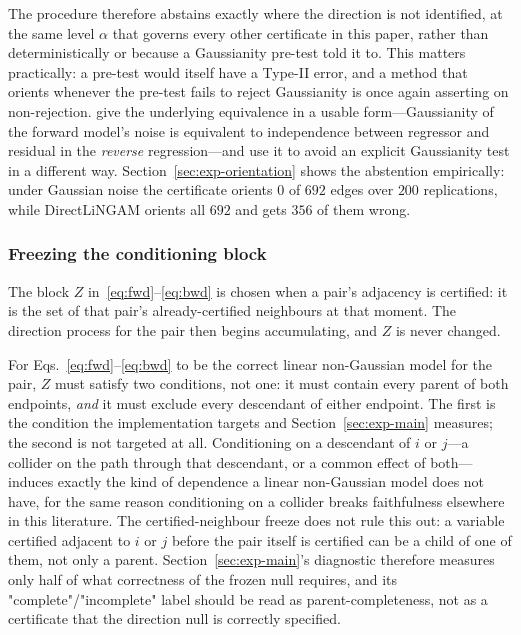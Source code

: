 The procedure therefore abstains exactly where the direction is not
identified, at the same level $\alpha$ that governs every other certificate in
this paper, rather than deterministically or because a Gaussianity pre-test
told it to. This matters practically: a pre-test would itself have a Type-II
error, and a method that orients whenever the pre-test fails to reject
Gaussianity is once again asserting on non-rejection.
\citet{ding2025gaussdetect} give the underlying equivalence in a usable
form---Gaussianity of the forward model's noise is equivalent to independence
between regressor and residual in the \emph{reverse} regression---and use it
to avoid an explicit Gaussianity test in a different way.
Section~\ref{sec:exp-orientation} shows the abstention empirically: under
Gaussian noise the certificate orients $0$ of $692$ edges over $200$
replications, while DirectLiNGAM orients all $692$ and gets $356$ of them
wrong.

\subsubsection{Freezing the conditioning block}\label{sec:freezing}

The block $Z$ in~\eqref{eq:fwd}--\eqref{eq:bwd} is chosen when a pair's
adjacency is certified: it is the set of that pair's already-certified
neighbours at that moment. The direction process for the pair then begins
accumulating, and $Z$ is never changed.

For Eqs.~\eqref{eq:fwd}--\eqref{eq:bwd} to be the correct linear
non-Gaussian model for the pair, $Z$ must satisfy two conditions, not one:
it must contain every parent of both endpoints, \emph{and} it must exclude
every descendant of either endpoint. The first is the condition the
implementation targets and Section~\ref{sec:exp-main} measures; the second
is not targeted at all. Conditioning on a descendant of $i$ or $j$---a
collider on the path through that descendant, or a common effect of
both---induces exactly the kind of dependence a linear non-Gaussian model
does not have, for the same reason conditioning on a collider breaks
faithfulness elsewhere in this literature. The certified-neighbour freeze
does not rule this out: a variable certified adjacent to $i$ or $j$ before
the pair itself is certified can be a child of one of them, not only a
parent. Section~\ref{sec:exp-main}'s diagnostic therefore measures only
half of what correctness of the frozen null requires, and its
"complete"/"incomplete" label should be read as parent-completeness, not
as a certificate that the direction null is correctly specified.

